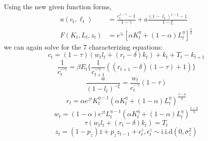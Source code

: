 \documentclass[12pt]{article}
\newenvironment{problem}[2][Problem]{\begin{trivlist}
\item[\hskip \labelsep {\bfseries #1}\hskip \labelsep {\bfseries #2}]}{\end{trivlist}}
\begin{document}
\begin{problem}{4.} 
Using the new given function forms,
\begin{equation}\label{DSGE_HW_CharEq_CES_eq01}
\begin{split}
u(c_t,\ell_t) & = \frac{c^{1-\gamma}_t -1}{1-\gamma}+ a \frac{(1-\ell_t)^{1-\xi}-1}{1-\xi}      \\
F(K_t,L_t,z_t) & = e^{z_t}\left[\alpha K^{\eta}_t +(1-\alpha)L^{\eta}_t \right]^{\frac{1}{\eta}}   \nonumber
\end{split}
\end{equation}
we can again solve for the 7 characterizing equations:
$$c_t = (1-\tau)(w_tl_t + (r_t -\delta)k_t) + k_t + T_t - k_{t+1}$$
$$\frac{1}{c_t^{-\gamma}} = \beta E_t \big\{ \frac{1}{c_{t+1}^{-\gamma}}((r_{t+1} - \delta)(1-\tau)+ 1) \big\}$$
$$\frac{a}{(1-l_t)^{-\xi}} = \frac{w_t}{c_t^{-\gamma}}(1-\tau)$$
$$r_t = \alpha e^{zt}K_t^{\eta-1} (\alpha K_t^\eta+ (1-\alpha)L_t^\eta)^{\frac{1-\eta}{\eta}}$$
$$w_t = (1-\alpha) e^{zt}L_t^{\eta-1}(\alpha K_t^\eta+ (1-\alpha)L_t^\eta)^{\frac{1-\eta}{\eta}}$$
$$\tau(w_tl_t + (r_t -\delta)k_t) = T_t$$
$$z_t = (1-p_z)\bar{z} + p_zz_{t-1} + \epsilon^z_t,  \epsilon^z_t \sim \text{i.i.d}(0, \sigma^2_z)$$
\end{problem}
\end{document}
